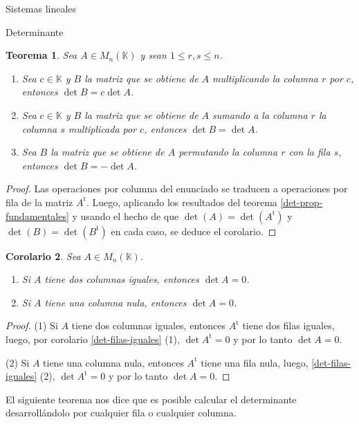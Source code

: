 \documentclass[a4paper,12pt,twoside,spanish,reqno]{amsbook}
\numberwithin{equation}{section}
\newtheorem{teorema}{Teorema}[section]
\newtheorem{corolario}[teorema]{Corolario}
\theoremstyle{definition}
\theoremstyle{remark}
\renewcommand{\t}{{\operatorname{t}}}
\newcommand{\K}{\mathbb K}
\begin{document}
\begin{chapter}{Sistemas lineales}
\begin{section}{Determinante}
    
    \begin{teorema}\label{det-opr-col}
        Sea $A  \in M_n(\K)$ y sean $1 \le r,s \le n$.
        \begin{enumerate}
            \item Sea $c \in \K$ y $B$ la matriz que se obtiene de $A$ multiplicando la columna $r$ por $c$, entonces $\det B = c \det A$.
            \item  Sea $c \in \K$ y $B$ la matriz que se obtiene de $A$ sumando a la columna $r$ la columna $s$ multiplicada por $c$, entonces $\det B = \det A$.
            \item Sea $B$ la matriz que se obtiene de $A$ permutando la columna $r$ con la fila $s$, entonces $\det B = -\det A$.
        \end{enumerate}
    \end{teorema}
    \begin{proof}
        Las operaciones por columna del enunciado se traducen a operaciones por fila de la matriz $A^\t$. Luego, aplicando los resultados del teorema  \ref{det-prop-fundamentales} y usando el hecho de que $\det(A) = \det(A^\t)$ y $\det(B) = \det(B^\t)$ en cada caso, se deduce el corolario. 
    \end{proof}
    
    \begin{corolario} Sea $A  \in M_n(\K)$.
        \begin{enumerate}
            \item Si $A$ tiene dos columnas iguales,  entonces $\det A=0$.
            \item Si $A$ tiene una columna nula, entonces $\det A =0$.
        \end{enumerate}
    \end{corolario}
    \begin{proof}
        (1) Si $A$ tiene dos columnas iguales,  entonces $A^\t$ tiene dos filas iguales, luego, por corolario \ref{det-filas-iguales} (1),  $\det A^\t =0$ y por lo tanto $\det A=0$.
        
        (2) Si $A$ tiene una columna nula,  entonces $A^\t$ tiene una fila nula, luego, \ref{det-filas-iguales} (2), $\det A^\t =0$ y por lo tanto $\det A=0$.
    \end{proof}
    
        El siguiente teorema nos dice  que es posible calcular el determinante desarrollándolo por cualquier fila o cualquier columna. 
    

\end{section}
\end{chapter}
\end{document}
